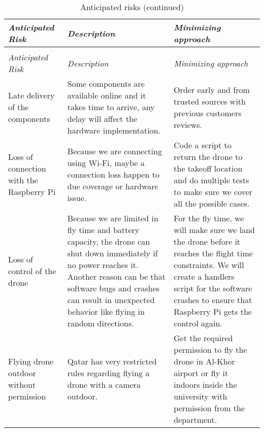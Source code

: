 \documentclass[../main.tex]{subfiles}
\begin{document}
\begin{center}
    \begin{xltabular}{\textwidth}{ X X X }
        \caption{Anticipated risks.}
        \label{tab:risks} \\
        \toprule
        \textit{Anticipated Risk} 
        & \textit{Description} 
        & \textit{Minimizing approach} \\
        \midrule
        \endfirsthead

        \caption[]{Anticipated risks (continued)} \\
        \toprule
        \textit{Anticipated Risk} 
        & \textit{Description} 
        & \textit{Minimizing approach} \\
        \midrule
        \endhead

        Late delivery of the components 
        & Some components are available online 
        and it takes time to arrive, 
        any delay will affect the hardware implementation.
        & Order early and from trusted sources with previous 
        customers reviews. \\
        
        Loss of connection with the Raspberry Pi
        & Because we are connecting using Wi-Fi, 
        maybe a connection loss 
        happen to due coverage or hardware issue.
        & Code a script to return the drone 
        to the takeoff location 
        and do multiple tests to make sure 
        we cover all the possible cases. \\
        
        Loss of control of the drone
        & Because we are limited in fly time 
        and battery capacity, 
        the drone can shut down immediately if 
        no power reaches it.
        Another reason can be that software bugs 
        and crashes can 
        result in unexpected behavior like flying 
        in random directions.
        & For the fly time, we will make sure 
        we land the drone before it reaches 
        the flight time constraints.
        We will create a handlers script 
        for the software crashes 
        to ensure that Raspberry Pi gets the 
        control again.  \\
        
        Flying drone outdoor without permission 
        & Qatar has very restricted rules regarding flying 
        a drone 
        with a camera outdoor.
        & Get the required permission to fly the drone in 
        Al-Khor airport or fly it indoors inside the 
        university with permission from the department. \\


\end{xltabular}
\end{center}
\end{document}
